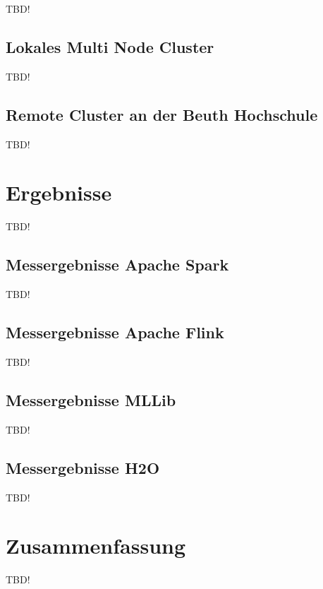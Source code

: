 TBD!

\subsection{Lokales Multi Node Cluster}
\label{section:tachyon}

TBD!

\subsection{Remote Cluster an der Beuth Hochschule}
\label{section:remote}

TBD!

\section{Ergebnisse}
\label{section:ergebnisse}

TBD!

\subsection{Messergebnisse Apache Spark}
\label{section:spark eval}

TBD!

\subsection{Messergebnisse Apache Flink}
\label{section:mllib arch}

TBD!

\subsection{Messergebnisse MLLib}
\label{section:mllib arch}

TBD!

\subsection{Messergebnisse H2O}
\label{section:mllib arch}

TBD!



\section{Zusammenfassung}
\label{section:zusammen}



TBD!
